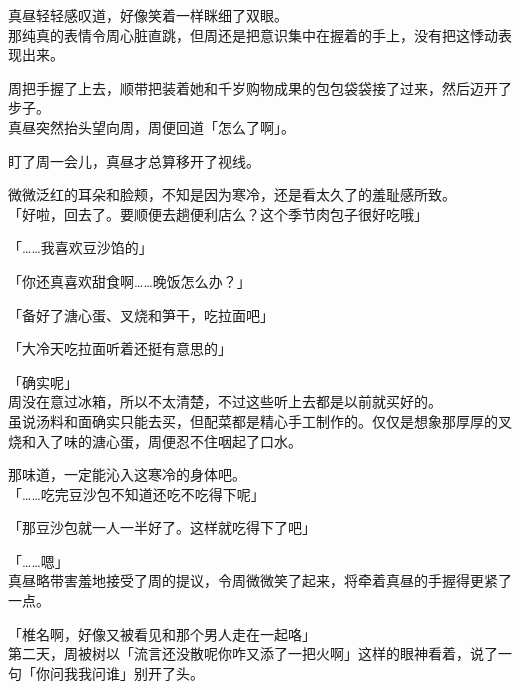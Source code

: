 真昼轻轻感叹道，好像笑着一样眯细了双眼。\\

那纯真的表情令周心脏直跳，但周还是把意识集中在握着的手上，没有把这悸动表现出来。

周把手握了上去，顺带把装着她和千岁购物成果的包包袋袋接了过来，然后迈开了步子。\\

真昼突然抬头望向周，周便回道「怎么了啊」。

盯了周一会儿，真昼才总算移开了视线。

微微泛红的耳朵和脸颊，不知是因为寒冷，还是看太久了的羞耻感所致。\\

「好啦，回去了。要顺便去趟便利店么？这个季节肉包子很好吃哦」

「……我喜欢豆沙馅的」

「你还真喜欢甜食啊……晚饭怎么办？」

「备好了溏心蛋、叉烧和笋干，吃拉面吧」

「大冷天吃拉面听着还挺有意思的」

「确实呢」\\

周没在意过冰箱，所以不太清楚，不过这些听上去都是以前就买好的。\\%

虽说汤料和面确实只能去买，但配菜都是精心手工制作的。仅仅是想象那厚厚的叉烧和入了味的溏心蛋，周便忍不住咽起了口水。

那味道，一定能沁入这寒冷的身体吧。\\

「……吃完豆沙包不知道还吃不吃得下呢」

「那豆沙包就一人一半好了。这样就吃得下了吧」

「……嗯」\\

真昼略带害羞地接受了周的提议，令周微微笑了起来，将牵着真昼的手握得更紧了一点。\\

\vspace{2\baselineskip}

「椎名啊，好像又被看见和那个男人走在一起咯」\\

第二天，周被树以「流言还没散呢你咋又添了一把火啊」这样的眼神看着，说了一句「你问我我问谁」别开了头。
